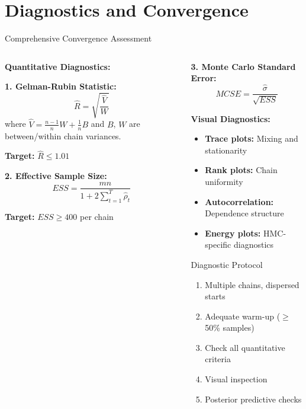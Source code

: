 \documentclass[aspectratio=169,11pt]{beamer}
\begin{document}
\section{Diagnostics and Convergence}

\begin{frame}{Comprehensive Convergence Assessment}
\begin{columns}
\begin{column}{0.5\textwidth}
\textbf{Quantitative Diagnostics:}

\textbf{1. Gelman-Rubin Statistic:}
\[\hat{R} = \sqrt{\frac{\hat{V}}{W}}\]
where $\hat{V} = \frac{n-1}{n}W + \frac{1}{n}B$ and $B$, $W$ are between/within chain variances.

\textbf{Target:} $\hat{R} \leq 1.01$

\vspace{0.3cm}
\textbf{2. Effective Sample Size:}
\[ESS = \frac{mn}{1 + 2\sum_{t=1}^T \hat{\rho}_t}\]

\textbf{Target:} $ESS \geq 400$ per chain
\end{column}
\begin{column}{0.5\textwidth}
\textbf{3. Monte Carlo Standard Error:}
\[MCSE = \frac{\hat{\sigma}}{\sqrt{ESS}}\]

\vspace{0.3cm}
\textbf{Visual Diagnostics:}
\begin{itemize}
\item \textbf{Trace plots:} Mixing and stationarity
\item \textbf{Rank plots:} Chain uniformity
\item \textbf{Autocorrelation:} Dependence structure
\item \textbf{Energy plots:} HMC-specific diagnostics
\end{itemize}

\vspace{0.3cm}
\begin{alertblock}{Diagnostic Protocol}
\begin{enumerate}
\item Multiple chains, dispersed starts
\item Adequate warm-up ($\geq$50\% samples)
\item Check all quantitative criteria
\item Visual inspection
\item Posterior predictive checks
\end{enumerate}
\end{alertblock}
\end{column}
\end{columns}
\end{frame}
\end{document}
